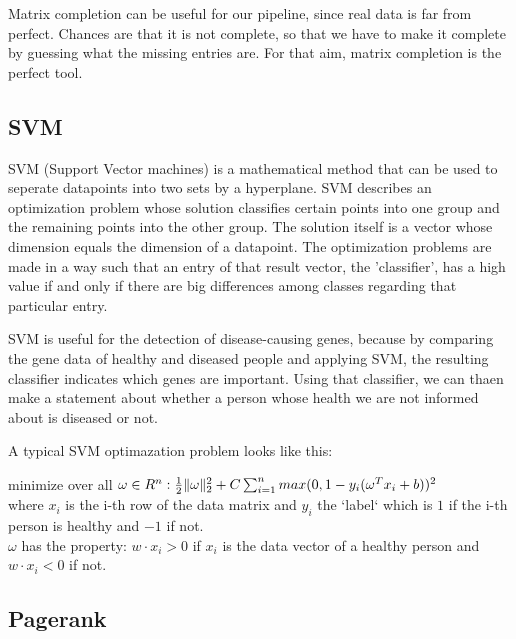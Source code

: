 \documentclass{bioinfo}
\begin{document}
 

Matrix completion can be useful for our pipeline, since real data is far from perfect. Chances are that it is not complete, so that we have to make it complete by guessing what the missing entries are. For that aim, matrix completion is the perfect tool. 

 

 

\subsection{SVM}
\label{svm}

SVM (Support Vector machines) is a mathematical method that can be used to seperate datapoints into two sets by a hyperplane. SVM describes an optimization problem whose solution classifies certain points into one group and the remaining points into the other group. The solution itself is a vector whose dimension equals the dimension of a datapoint. The optimization problems are made in a way such that an entry of that result vector, the 'classifier', has a high value if and only if there are big differences among classes regarding that particular entry. 

SVM is useful for the detection of disease-causing genes, because by comparing the gene data of healthy and diseased people and applying SVM, the resulting classifier indicates which genes are important. Using that classifier, we can thaen make a statement about whether a person whose health we are not informed about is diseased or not. 

A typical SVM optimazation problem looks like this: 

minimize over all $\omega \in R^{n}:\\  \frac{1}{2}\Vert\omega\Vert^2_2 + C \sum_{i=1}^{n} max(0,1-y_i(\omega ^T x_i + b))^2$\\ where $x_i$ is the i-th row of the data matrix and $y_i$ the `label` which is $1$ if the i-th person is healthy and $-1$ if not.\\
$\omega$ has the property: $w\cdot x_i > 0$ if $x_i$ is the data vector of a healthy person and $w\cdot x_i<0$ if not.\\

\subsection{Pagerank} 
\end{document}
